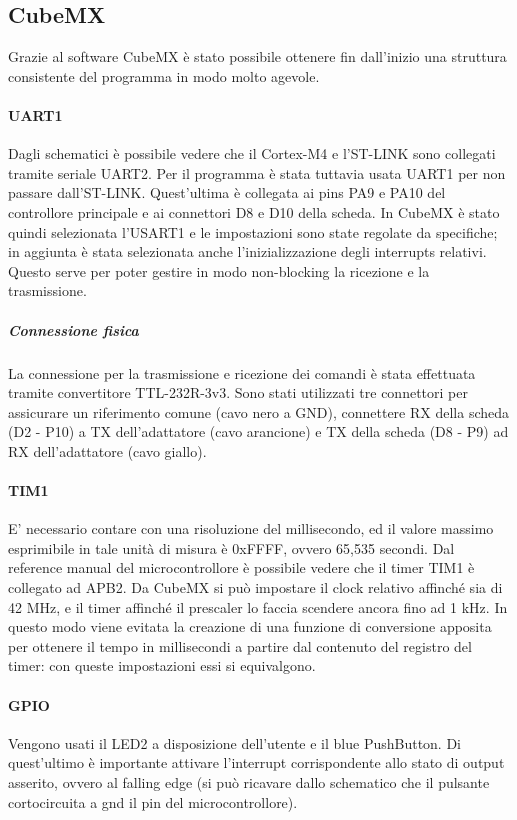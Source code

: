 \documentclass[a4paper]{article}
\begin{document}
	\subsection{CubeMX}
		Grazie al software CubeMX è stato possibile ottenere fin dall'inizio una struttura consistente del programma in modo molto agevole. 
		\paragraph{UART1} Dagli schematici è possibile vedere che il Cortex-M4 e l'ST-LINK sono collegati tramite seriale UART2. Per il programma è stata tuttavia usata UART1 per non passare dall'ST-LINK. Quest'ultima è collegata ai pins PA9 e PA10 del controllore principale e ai connettori D8 e D10 della scheda.
		In CubeMX è stato quindi selezionata l'USART1 e le impostazioni sono state regolate da specifiche; in aggiunta è stata selezionata anche l'inizializzazione degli interrupts relativi. Questo serve per poter gestire in modo non-blocking la ricezione e la trasmissione.
		\subparagraph*{Connessione fisica} La connessione per la trasmissione e ricezione dei comandi è stata effettuata tramite convertitore TTL-232R-3v3. Sono stati utilizzati tre connettori per assicurare un riferimento comune (cavo nero a GND), connettere RX della scheda (D2 - P10) a TX dell'adattatore (cavo arancione) e TX della scheda (D8 - P9) ad RX dell'adattatore (cavo giallo).
		\paragraph{TIM1} E' necessario contare con una risoluzione del millisecondo, ed il valore massimo esprimibile in tale unità di misura è 0xFFFF, ovvero 65,535 secondi. 
		Dal reference manual del microcontrollore è possibile vedere che il timer TIM1 è collegato ad APB2. Da CubeMX si può impostare il clock relativo affinché sia di 42 MHz, e il timer affinché il prescaler lo faccia scendere ancora fino ad 1 kHz. In questo modo viene evitata la creazione di una funzione di conversione apposita per ottenere il tempo in millisecondi a partire dal contenuto del registro del timer: con queste impostazioni essi si equivalgono.
		\paragraph{GPIO} Vengono usati il LED2 a disposizione dell'utente e il blue PushButton. Di quest'ultimo è importante attivare l'interrupt corrispondente allo stato di output asserito, ovvero al falling edge (si può ricavare dallo schematico che il pulsante cortocircuita a gnd il pin del microcontrollore).
\end{document}
